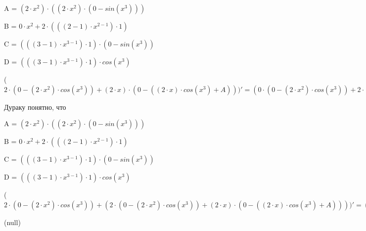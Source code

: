 \documentclass[12pt,a4paper,fleqn]{article}
\begin{document}
\begin{center}
A = $(2 \cdot x^{2}) \cdot ((2 \cdot x^{2}) \cdot (0-sin(x^{3})))$\end{center}
\begin{center}
B = $0 \cdot x^{2}+2 \cdot (((2-1) \cdot x^{2-1}) \cdot 1)$\end{center}
\begin{center}
C = $(((3-1) \cdot x^{3-1}) \cdot 1) \cdot (0-sin(x^{3}))$\end{center}
\begin{center}
D = $(((3-1) \cdot x^{3-1}) \cdot 1) \cdot cos(x^{3})$\end{center}
\begin{center}
 ($2 \cdot (0-(2 \cdot x^{2}) \cdot cos(x^{3}))+(2 \cdot x) \cdot (0-((2 \cdot x) \cdot cos(x^{3})+A)))'
  = (0 \cdot (0-(2 \cdot x^{2}) \cdot cos(x^{3}))+2 \cdot (0-((B) \cdot cos(x^{3})+(2 \cdot x^{2}) \cdot (C))))+((0 \cdot x+2 \cdot 1) \cdot (0-((2 \cdot x) \cdot cos(x^{3})+A))+(2 \cdot x) \cdot (0-(((0 \cdot x+2 \cdot 1) \cdot cos(x^{3})+(2 \cdot x) \cdot (C))+((B) \cdot ((2 \cdot x^{2}) \cdot (0-sin(x^{3})))+(2 \cdot x^{2}) \cdot ((B) \cdot (0-sin(x^{3}))+(2 \cdot x^{2}) \cdot (0-D))))))$\end{center}
Дураку понятно, что

\begin{center}
A = $(2 \cdot x^{2}) \cdot ((2 \cdot x^{2}) \cdot (0-sin(x^{3})))$\end{center}
\begin{center}
B = $0 \cdot x^{2}+2 \cdot (((2-1) \cdot x^{2-1}) \cdot 1)$\end{center}
\begin{center}
C = $(((3-1) \cdot x^{3-1}) \cdot 1) \cdot (0-sin(x^{3}))$\end{center}
\begin{center}
D = $(((3-1) \cdot x^{3-1}) \cdot 1) \cdot cos(x^{3})$\end{center}
\begin{center}
 ($2 \cdot (0-(2 \cdot x^{2}) \cdot cos(x^{3}))+(2 \cdot (0-(2 \cdot x^{2}) \cdot cos(x^{3}))+(2 \cdot x) \cdot (0-((2 \cdot x) \cdot cos(x^{3})+A))))'
  = (0 \cdot (0-(2 \cdot x^{2}) \cdot cos(x^{3}))+2 \cdot (0-((B) \cdot cos(x^{3})+(2 \cdot x^{2}) \cdot (C))))+((0 \cdot (0-(2 \cdot x^{2}) \cdot cos(x^{3}))+2 \cdot (0-((B) \cdot cos(x^{3})+(2 \cdot x^{2}) \cdot (C))))+((0 \cdot x+2 \cdot 1) \cdot (0-((2 \cdot x) \cdot cos(x^{3})+A))+(2 \cdot x) \cdot (0-(((0 \cdot x+2 \cdot 1) \cdot cos(x^{3})+(2 \cdot x) \cdot (C))+((B) \cdot ((2 \cdot x^{2}) \cdot (0-sin(x^{3})))+(2 \cdot x^{2}) \cdot ((B) \cdot (0-sin(x^{3}))+(2 \cdot x^{2}) \cdot (0-D)))))))$\end{center}
(null)\cite{link4}
\end{document}
